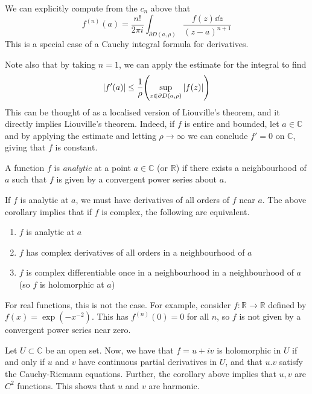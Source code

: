 \begin{remark}
	We can explicitly compute from the \( c_n \) above that
	\[
		f^{(n)}(a) = \frac{n!}{2\pi i}\int_{\partial D(a,\rho)} \frac{f(z) \dd{z}}{(z-a)^{n+1}}
	\]
	This is a special case of a Cauchy integral formula for derivatives.

	Note also that by taking \( n = 1 \), we can apply the estimate for the integral to find
	\[
		\abs{f'(a)} \leq \frac{1}{\rho}\qty(\sup_{z \in \partial D(a,\rho)} \abs{f(z)})
	\]
	This can be thought of as a localised version of Liouville's theorem, and it directly implies Liouville's theorem.
	Indeed, if \( f \) is entire and bounded, let \( a \in \mathbb C \) and by applying the estimate and letting \( \rho \to \infty \) we can conclude \( f' = 0 \) on \( \mathbb C \), giving that \( f \) is constant.
\end{remark}
\begin{definition}
	A function \( f \) is \textit{analytic} at a point \( a \in \mathbb C \) (or \( \mathbb R \)) if there exists a neighbourhood of \( a \) such that \( f \) is given by a convergent power series about \( a \).
\end{definition}
\begin{remark}
	If \( f \) is analytic at \( a \), we must have derivatives of all orders of \( f \) near \( a \).
	The above corollary implies that if \( f \) is complex, the following are equivalent.
	\begin{enumerate}
		\item \( f \) is analytic at \( a \)
		\item \( f \) has complex derivatives of all orders in a neighbourhood of \( a \)
		\item \( f \) is complex differentiable once in a neighbourhood in a neighbourhood of \( a \) (so \( f \) is holomorphic at \( a \))
	\end{enumerate}
	For real functions, this is not the case.
	For example, consider \( f \colon \mathbb R \to \mathbb R \) defined by \( f(x) = \exp(-x^{-2}) \).
	This has \( f^{(n)}(0) = 0 \) for all \( n \), so \( f \) is not given by a convergent power series near zero.

	Let \( U \subset \mathbb C \) be an open set.
	Now, we have that \( f = u+iv \) is holomorphic in \( U \) if and only if \( u \) and \( v \) have continuous partial derivatives in \( U \), and that \( u.v \) satisfy the Cauchy-Riemann equations.
	Further, the corollary above implies that \( u, v \) are \( C^2 \) functions.
	This shows that \( u \) and \( v \) are harmonic.
\end{remark}

